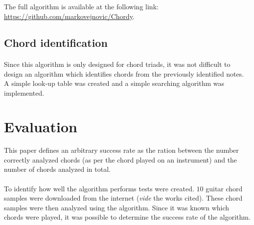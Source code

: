 \documentclass{article}
\begin{document}
\subsection*{}
\paragraph*{}
The full algorithm is available at the following link:
\url{https://github.com/markovejnovic/Chordy}.

\subsection{Chord identification}
\paragraph*{}
Since this algorithm is only designed for chord triads, it was not difficult 
to design an algorithm which identifies chords from the previously identified 
notes. A simple look-up table was created and a simple searching algorithm was 
implemented.

\section{Evaluation}

\paragraph*{}
This paper defines an arbitrary success rate as the ration between the number
correctly analyzed chords (as per the chord played on an instrument) and the
number of chords analyzed in total.

\paragraph*{}
To identify how well the algorithm performs tests were created. $10$ guitar 
chord samples were downloaded from the internet (\textit{vide} the works 
cited). These chord samples were then analyzed using the algorithm. Since it 
was known which chords were played, it was possible to determine the success
rate of the algorithm.
\end{document}

